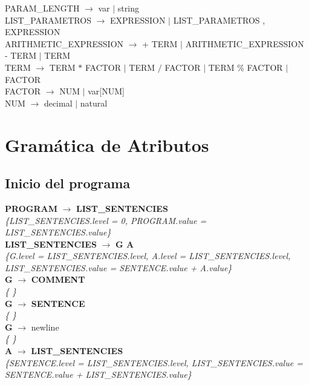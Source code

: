 \documentclass[10pt,a4paper]{article}
\begin{document}
PARAM\_LENGTH $\rightarrow$ var $|$ string \\

LIST\_PARAMETROS $\rightarrow$ EXPRESSION $|$ LIST\_PARAMETROS , EXPRESSION \\

ARITHMETIC\_EXPRESSION $\rightarrow$  + TERM $|$ ARITHMETIC\_EXPRESSION - TERM $|$ TERM \\

TERM $\rightarrow$ TERM $*$ FACTOR $|$ TERM $/$ FACTOR $|$ TERM \% FACTOR $|$ FACTOR \\

FACTOR $\rightarrow$ NUM $|$ var[NUM] \\

NUM $\rightarrow$ decimal $|$ natural


\section{Gramática de Atributos}

\subsection{Inicio del programa}
\textbf{PROGRAM} $\rightarrow$ \textbf{LIST\_SENTENCIES} \\
\textit{\{LIST\_SENTENCIES.level = 0, PROGRAM.value = LIST\_SENTENCIES.value\}}\\


\textbf{LIST\_SENTENCIES} $\rightarrow$ \textbf{G A}\\
\textit{\{G.level = LIST\_SENTENCIES.level, A.level = LIST\_SENTENCIES.level, LIST\_SENTENCIES.value = SENTENCE.value + A.value\}} \\

\textbf{G} $\rightarrow$ \textbf{COMMENT} \\
\textit{\{   \}} \\

\textbf{G} $\rightarrow$ \textbf{SENTENCE} \\
\textit{\{   \}} \\

\textbf{G} $\rightarrow$ newline \\
\textit{\{   \}} \\

\textbf{A} $\rightarrow$ \textbf{LIST\_SENTENCIES}\\
\textit{\{SENTENCE.level = LIST\_SENTENCIES.level, LIST\_SENTENCIES.value = SENTENCE.value + LIST\_SENTENCIES.value\}} \\
\end{document}

